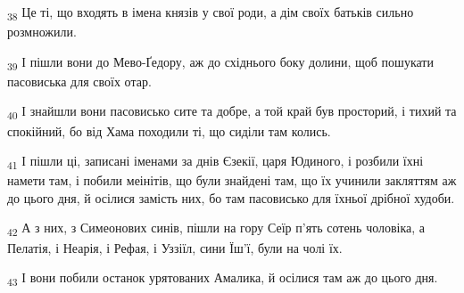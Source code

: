 \begin{tcolorbox}
\textsubscript{38} Це ті, що входять в імена князів у свої роди, а дім своїх батьків сильно розмножили.
\end{tcolorbox}
\begin{tcolorbox}
\textsubscript{39} І пішли вони до Мево-Ґедору, аж до східнього боку долини, щоб пошукати пасовиська для своїх отар.
\end{tcolorbox}
\begin{tcolorbox}
\textsubscript{40} І знайшли вони пасовисько сите та добре, а той край був просторий, і тихий та спокійний, бо від Хама походили ті, що сиділи там колись.
\end{tcolorbox}
\begin{tcolorbox}
\textsubscript{41} І пішли ці, записані іменами за днів Єзекії, царя Юдиного, і розбили їхні намети там, і побили меінітів, що були знайдені там, що їх учинили закляттям аж до цього дня, й осілися замість них, бо там пасовисько для їхньої дрібної худоби.
\end{tcolorbox}
\begin{tcolorbox}
\textsubscript{42} А з них, з Симеонових синів, пішли на гору Сеїр п'ять сотень чоловіка, а Пелатія, і Неарія, і Рефая, і Уззіїл, сини Їш'ї, були на чолі їх.
\end{tcolorbox}
\begin{tcolorbox}
\textsubscript{43} І вони побили останок урятованих Амалика, й осілися там аж до цього дня.
\end{tcolorbox}
